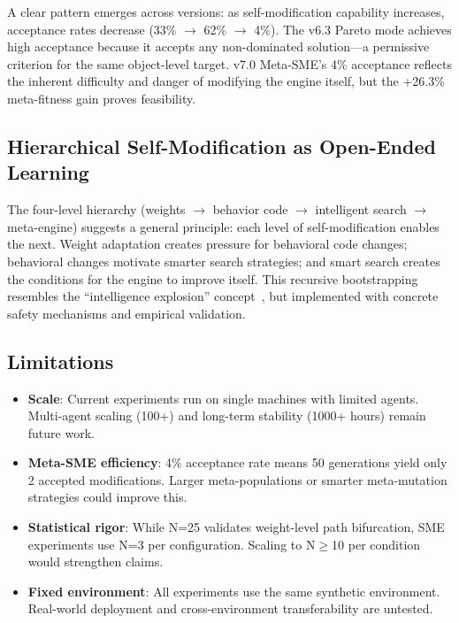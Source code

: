 \documentclass[11pt]{article}
\begin{document}
A clear pattern emerges across versions: as self-modification capability increases, acceptance rates decrease (33\% $\to$ 62\% $\to$ 4\%). The v6.3 Pareto mode achieves high acceptance because it accepts any non-dominated solution---a permissive criterion for the same object-level target. v7.0 Meta-SME's 4\% acceptance reflects the inherent difficulty and danger of modifying the engine itself, but the +26.3\% meta-fitness gain proves feasibility.

\subsection{Hierarchical Self-Modification as Open-Ended Learning}

The four-level hierarchy (weights $\to$ behavior code $\to$ intelligent search $\to$ meta-engine) suggests a general principle: each level of self-modification enables the next. Weight adaptation creates pressure for behavioral code changes; behavioral changes motivate smarter search strategies; and smart search creates the conditions for the engine to improve itself. This recursive bootstrapping resembles the ``intelligence explosion'' concept~\cite{schmidhuber2003}, but implemented with concrete safety mechanisms and empirical validation.

\subsection{Limitations}

\begin{itemize}
    \item \textbf{Scale}: Current experiments run on single machines with limited agents. Multi-agent scaling (100+) and long-term stability (1000+ hours) remain future work.
    \item \textbf{Meta-SME efficiency}: 4\% acceptance rate means 50 generations yield only 2 accepted modifications. Larger meta-populations or smarter meta-mutation strategies could improve this.
    \item \textbf{Statistical rigor}: While N=25 validates weight-level path bifurcation, SME experiments use N=3 per configuration. Scaling to N$\ge$10 per condition would strengthen claims.
    \item \textbf{Fixed environment}: All experiments use the same synthetic environment. Real-world deployment and cross-environment transferability are untested.
\end{itemize}
\end{document}
